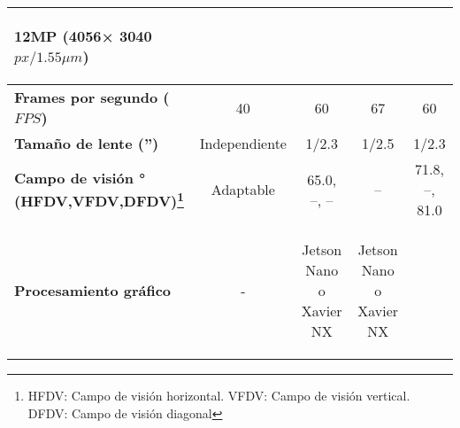 \begin{itemize}
\begin{savenotes}
\begin{mytable}[H]
\begin{tabular}{l|c|c|c|c|}
				\begin{minipage}{\mythirdmaxsizeofcontenttable}\begin{myflushcenterinsidetable}
					12MP (4056× 3040 $px/1.55{\mu}m$)
				\end{myflushcenterinsidetable}\end{minipage} 
				\\ \hline
				\multicolumn{1}{|l|}{
				\begin{minipage}{\myforthmaxsizeofcontenttable}	
					\textbf{Frames por segundo ($FPS$)}
				\end{minipage}
				} & 40 %
				& 60 & 67 & 
				60
				\\ \hline
				\multicolumn{1}{|l|}{
				\begin{minipage}{\myforthmaxsizeofcontenttable}	
					\textbf{Tamaño de lente ('')}
				\end{minipage}
				} & Independiente & 1/2.3 & 1/2.5 &
				1/2.3
				\\ \hline
				\multicolumn{1}{|l|}{
				\begin{minipage}{\myforthmaxsizeofcontenttable}
					\textbf{Campo de visión ° (HFDV,VFDV,DFDV)\footnote{HFDV: Campo de visión horizontal. VFDV: Campo de visión vertical. DFDV: Campo de visión diagonal}}
				\end{minipage}
				} & Adaptable & 65.0, --, -- & -- & 
				71.8, --, 81.0
				\\ \hline
				\multicolumn{1}{|l|}{
				\begin{minipage}{\myforthmaxsizeofcontenttable}	
					\textbf{Procesamiento gráfico}
				\end{minipage}
				} & - & 
				\begin{minipage}{\mythirdmaxsizeofcontenttable}\begin{myflushcenterinsidetable}
					Jetson Nano o Xavier NX
				\end{myflushcenterinsidetable}\end{minipage} & 
				\begin{minipage}{\mythirdmaxsizeofcontenttable}\begin{myflushcenterinsidetable}
					Jetson Nano o Xavier NX

\end{myflushcenterinsidetable}
\end{minipage}
\end{tabular}
\end{mytable}
\end{savenotes}
\end{itemize}

